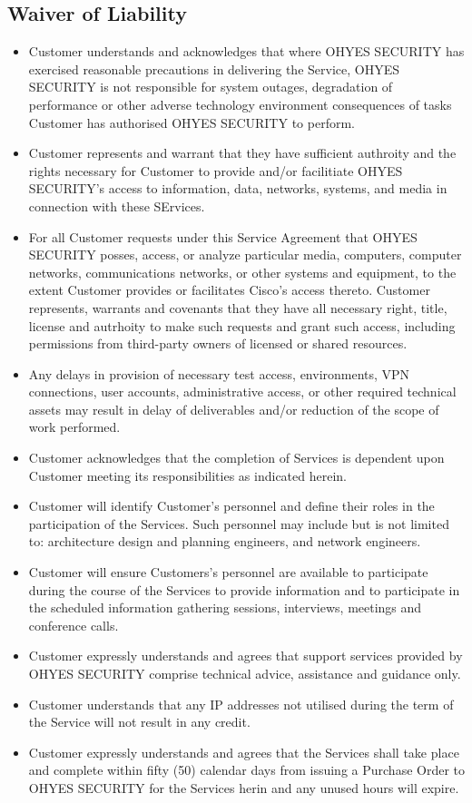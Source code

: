 \documentclass[11pt, oneside]{article}   	%
\begin{document}
\subsection{Waiver of Liability}
\begin{itemize}
\item{
	Customer understands and acknowledges that where OHYES SECURITY has
	exercised reasonable precautions in delivering the Service, OHYES
	SECURITY is not responsible for system outages, degradation of
	performance or other adverse technology environment consequences of
	tasks Customer has authorised OHYES SECURITY to perform.
}
\item{
	Customer represents and warrant that they have sufficient authroity and
	the rights necessary for Customer to provide and/or facilitiate OHYES 
	SECURITY's access to information, data, networks, systems, and media in
	connection with these SErvices.
}
\item{
	For all Customer requests under this Service Agreement that OHYES SECURITY
	posses, access, or analyze particular media, computers, computer networks,
	communications networks, or other systems and equipment, to the extent
	Customer provides or facilitates Cisco's access thereto. Customer
	represents, warrants and covenants that they have all necessary right, 
	title, license and autrhoity to make such requests and grant such access, 
	including permissions from third-party owners of licensed or shared resources.
}
\item{
	Any delays in provision of necessary test access, environments, VPN 
	connections, user accounts, administrative access, or other required 
	technical assets may result in delay of deliverables and/or reduction of 
	the scope of work performed.
}
\item {
	Customer acknowledges that the completion of Services is dependent upon 
	Customer meeting its responsibilities as indicated herein.
}
\item {
	Customer will identify Customer's personnel and define their roles in the 
	participation of the Services. Such personnel may include but is not limited 
	to: architecture design and planning engineers, and network engineers.
}
\item {
	Customer will ensure Customers's personnel are available to participate during 
	the course of the Services to provide information and to participate in the 
	scheduled information gathering sessions, interviews, meetings and conference 
	calls.
}
\item {
	Customer expressly understands and agrees that support services provided by 
	OHYES SECURITY comprise technical advice, assistance and guidance only.
}
\item {
	Customer understands that any IP addresses not utilised during the term of 
	the Service will not result in any credit.
}
\item {
	Customer expressly understands and agrees that the Services shall take place 
	and complete within fifty (50) calendar days from issuing a Purchase Order to 
	OHYES SECURITY for the Services herin and any unused hours will expire.
}
\end{itemize}
\end{document}
